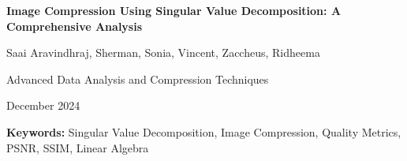 \documentclass[12pt,a4paper]{article}
\begin{document}
\begin{titlepage}
    \centering
    \vspace*{2cm}
    
    {\Huge\bfseries Image Compression Using Singular Value Decomposition: A Comprehensive Analysis\par}
    
    \vspace{1.5cm}
    
    {\Large
    Saai Aravindhraj, Sherman, Sonia, Vincent, Zaccheus, Ridheema\par}
    
    \vspace{1cm}
    
    {\large Advanced Data Analysis and Compression Techniques\par}
    
    \vspace{0.5cm}
    
    {\large December 2024\par}
    
    \vfill
    
    \begin{abstract}
    This report presents a comprehensive analysis of image compression using Singular Value Decomposition (SVD), a linear algebra technique that enables efficient dimensionality reduction while preserving essential image characteristics. We developed a complete software framework for SVD-based image compression, including batch processing capabilities, quality evaluation metrics, and interactive visualization tools. Our experimental analysis across multiple image categories (portraits, landscapes, and textures) demonstrates that SVD compression achieves significant storage reduction while maintaining acceptable visual quality. The results show that retaining 20-50 singular values typically provides compression ratios of 3-8$\times$ with PSNR values above 25dB and SSIM scores above 0.8. This work contributes both theoretical insights into SVD compression characteristics and practical tools for image compression research and education.
    \end{abstract}
    
    \vspace{1cm}
    
    {\large\textbf{Keywords:} Singular Value Decomposition, Image Compression, Quality Metrics, PSNR, SSIM, Linear Algebra\par}
    
\end{titlepage}
\end{document}
